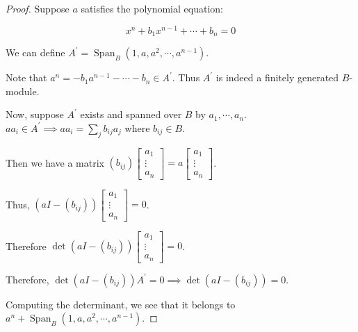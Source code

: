 \documentclass{article}
\theoremstyle{definition}
\begin{document}
    \begin{proof}
        Suppose \(a\) satisfies the polynomial equation:

        \[
            x^n + b_1 x^{n-1} + \cdots + b_n = 0
        \]

        We can define \(A^{\prime} = \operatorname{Span}_B(1, a, a^2, \cdots , a^{n-1})\).

        Note that \(a^n = -b_1 a^{n-1} - \cdots - b_n \in A^{\prime}\). Thus \(A^{\prime}\) is indeed a finitely generated \(B\)-module.
        
        Now, suppose \(A^{\prime}\) exists and spanned over \(B\) by \(a_1 , \cdots , a_n\). \(a a_i \in A^{\prime} \implies a a_i = \sum_{j} b_{ij} a_j\) where \(b_{ij} \in B\).

        Then we have a matrix \((b_{ij}) \begin{bmatrix}
            a_1 \\
            \vdots \\
            a_n
        \end{bmatrix} = a \begin{bmatrix}
            a_1 \\
            \vdots \\
            a_n
        \end{bmatrix}\).
        
        Thus, \((aI - (b_{ij})) \begin{bmatrix}
            a_1 \\
            \vdots \\
            a_n
        \end{bmatrix} = 0\).
        
        Therefore \(\det (aI - (b_{ij})) \begin{bmatrix}
            a_1 \\
            \vdots \\
            a_n
        \end{bmatrix} = 0\).
        
        Therefore, \(\det(aI - (b_{ij})) A^{\prime} = 0 \implies \det (aI - (b_{ij})) = 0\).
        
        Computing the determinant, we see that it belongs to \(a^n + \operatorname{Span}_B(1, a, a^2, \cdots , a^{n-1})\).
    \end{proof}
\end{document}
